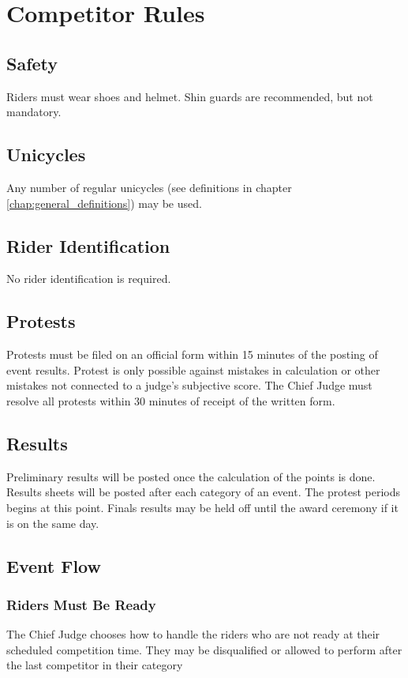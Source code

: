 \chapter{Competitor Rules}

\section{Safety}

Riders must wear shoes and helmet.
Shin guards are recommended, but not mandatory.

\section{Unicycles}

Any number of regular unicycles (see definitions in chapter \ref{chap:general_definitions}) may be used.

\section{Rider Identification}

No rider identification is required.

\section{Protests}

Protests must be filed on an official form within 15 minutes of the posting of event results.
Protest is only possible against mistakes in calculation or other mistakes not connected to a judge's subjective score.
The Chief Judge must resolve all protests within 30 minutes of receipt of the written form.

\section{Results}
Preliminary results will be posted once the calculation of the points is done.
Results sheets will be posted after each category of an event.
The protest periods begins at this point.
Finals results may be held off until the award ceremony if it is on the same day.

\section{Event Flow}

\subsection{Riders Must Be Ready}
The Chief Judge chooses how to handle the riders who are not ready at their scheduled competition time.
They may be disqualified or allowed to perform after the last competitor in their category

